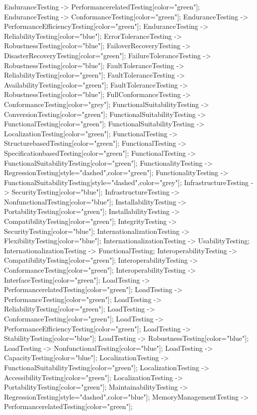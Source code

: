 \documentclass{article}
\begin{document}
{EnduranceTesting -> PerformancerelatedTesting[color="green"];
EnduranceTesting -> ConformanceTesting[color="green"];
EnduranceTesting -> PerformanceEfficiencyTesting[color="green"];
EnduranceTesting -> ReliabilityTesting[color="blue"];
ErrorToleranceTesting -> RobustnessTesting[color="blue"];
FailoverRecoveryTesting -> DisasterRecoveryTesting[color="green"];
FailureToleranceTesting -> RobustnessTesting[color="blue"];
FaultToleranceTesting -> ReliabilityTesting[color="green"];
FaultToleranceTesting -> AvailabilityTesting[color="green"];
FaultToleranceTesting -> RobustnessTesting[color="blue"];
FullConformanceTesting -> ConformanceTesting[color="grey"];
FunctionalSuitabilityTesting -> ConversionTesting[color="green"];
FunctionalSuitabilityTesting -> FunctionalTesting[color="green"];
FunctionalSuitabilityTesting -> LocalizationTesting[color="green"];
FunctionalTesting -> StructurebasedTesting[color="green"];
FunctionalTesting -> SpecificationbasedTesting[color="green"];
FunctionalTesting -> FunctionalSuitabilityTesting[color="green"];
FunctionalityTesting -> RegressionTesting[style="dashed",color="green"];
FunctionalityTesting -> FunctionalSuitabilityTesting[style="dashed",color="grey"];
InfrastructureTesting -> SecurityTesting[color="blue"];
InfrastructureTesting -> NonfunctionalTesting[color="blue"];
InstallabilityTesting -> PortabilityTesting[color="green"];
InstallabilityTesting -> CompatibilityTesting[color="green"];
IntegrityTesting -> SecurityTesting[color="blue"];
InternationalizationTesting -> FlexibilityTesting[color="blue"];
InternationalizationTesting -> UsabilityTesting;
InternationalizationTesting -> FunctionalTesting;
InteroperabilityTesting -> CompatibilityTesting[color="green"];
InteroperabilityTesting -> ConformanceTesting[color="green"];
InteroperabilityTesting -> InterfaceTesting[color="green"];
LoadTesting -> PerformancerelatedTesting[color="green"];
LoadTesting -> PerformanceTesting[color="green"];
LoadTesting -> ReliabilityTesting[color="green"];
LoadTesting -> ConformanceTesting[color="green"];
LoadTesting -> PerformanceEfficiencyTesting[color="green"];
LoadTesting -> StabilityTesting[color="blue"];
LoadTesting -> RobustnessTesting[color="blue"];
LoadTesting -> NonfunctionalTesting[color="blue"];
LoadTesting -> CapacityTesting[color="blue"];
LocalizationTesting -> FunctionalSuitabilityTesting[color="green"];
LocalizationTesting -> AccessibilityTesting[color="green"];
LocalizationTesting -> PortabilityTesting[color="green"];
MaintainabilityTesting -> RegressionTesting[style="dashed",color="blue"];
MemoryManagementTesting -> PerformancerelatedTesting[color="green"];
}
\end{document}
